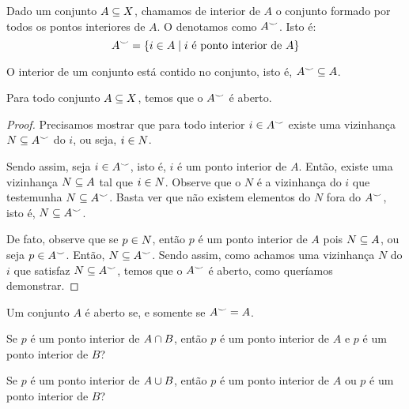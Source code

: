 \documentclass[a4paper,12pt,oneside]{book}
\begin{document}
\begin{definition}
	\label{def:interior}
	Dado um conjunto $A \subseteq X$, chamamos de interior de $A$ o conjunto formado por todos os pontos interiores de $A$. O denotamos como $A^{\smile}$. Isto é:
	\[
		A^{\smile} = \left\{ i \in A \mid \text{$i$ é ponto interior de $A$} \right\}
	\]
\end{definition}

\begin{fact}
	\label{fact:interior-contido}
	O interior de um conjunto está contido no conjunto, isto é, $A^{\smile} \subseteq A$.
\end{fact}

\begin{theorem}
	\label{thm:interior-aberto}
	Para todo conjunto $A \subseteq X$, temos que o $A^{\smile}$ é aberto.
\end{theorem}

\begin{proof}
	Precisamos mostrar que para todo interior $i \in A^{\smile}$ existe uma vizinhança $N \subseteq A^{\smile}$ do $i$, ou seja, $i \in N$. 
	
	Sendo assim, seja $i \in A^{\smile}$, isto é, $i$ é um ponto interior de $A$. Então, existe uma vizinhança $N \subseteq A$ tal que $i \in N$. Observe que o $N$ é a vizinhança do $i$ que testemunha $N \subseteq A^{\smile}$. Basta ver que não existem elementos do $N$ fora do $A^{\smile}$, isto é, $N \subseteq A^{\smile}$.
	
	De fato, observe que se $p \in N$, então $p$ é um ponto interior de $A$ pois $N \subseteq A$, ou seja $p \in A^{\smile}$. Então, $N \subseteq A^{\smile}$. Sendo assim, como achamos uma vizinhança $N$ do $i$ que satisfaz $N \subseteq A^{\smile}$, temos que o $A^{\smile}$ é aberto, como queríamos demonstrar.
\end{proof}

\begin{corollary}
	Um conjunto $A$ é aberto se, e somente se $A^{\smile} = A$.
\end{corollary}

\begin{question}
	Se $p$ é um ponto interior de $A \cap B$, então $p$ é um ponto interior de $A$ e $p$ é um ponto interior de $B$?
\end{question}

\begin{question}
	Se $p$ é um ponto interior de $A \cup B$, então $p$ é um ponto interior de $A$ ou $p$ é um ponto interior de $B$?
\end{question}
\end{document}
